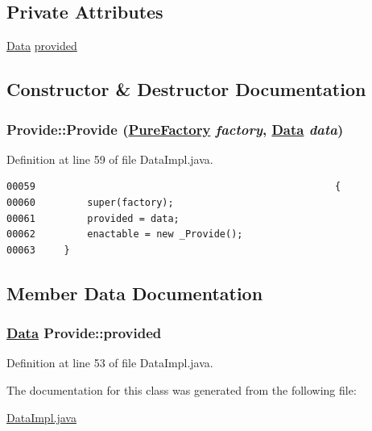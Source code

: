 \subsection*{Private Attributes}
\begin{CompactItemize}
\item 
\hyperlink{interfaceData}{Data} \hyperlink{classProvide_o0}{provided}
\end{CompactItemize}


\subsection{Constructor \& Destructor Documentation}
\hypertarget{classProvide_a0}{
\subsubsection[Provide]{\setlength{\rightskip}{0pt plus 5cm}Provide::Provide (\hyperlink{classPureFactory}{Pure\-Factory} {\em factory}, \hyperlink{interfaceData}{Data} {\em data})}}
\label{classProvide_a0}




Definition at line 59 of file Data\-Impl.java.\footnotesize\begin{verbatim}00059                                                    {
00060         super(factory);
00061         provided = data;
00062         enactable = new _Provide();
00063     }
\end{verbatim}\normalsize 


\subsection{Member Data Documentation}
\hypertarget{classProvide_o0}{
\subsubsection[provided]{\setlength{\rightskip}{0pt plus 5cm}\hyperlink{interfaceData}{Data} Provide::provided}}
\label{classProvide_o0}




Definition at line 53 of file Data\-Impl.java.

The documentation for this class was generated from the following file:\begin{CompactItemize}
\item 
\hyperlink{DataImpl_8java-source}{Data\-Impl.java}\end{CompactItemize}
